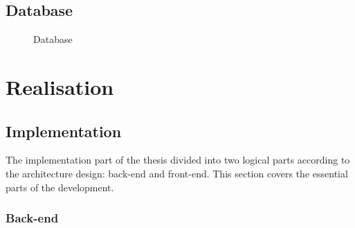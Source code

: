 \documentclass[thesis=B,english]{FITthesis}[2019/03/06]
\begin{document}
\section{Database}
 \begin{figure}[!ht]
\centering 
{}
\caption{Database} 
\label{fig:BP_DATABASE}   
\end{figure}   
\chapter{Realisation}
  
\section{Implementation}
The implementation part of the thesis divided into two logical parts according to the architecture design: back-end and front-end. This section covers the essential parts of the development.
\subsection{Back-end}
\end{document}
